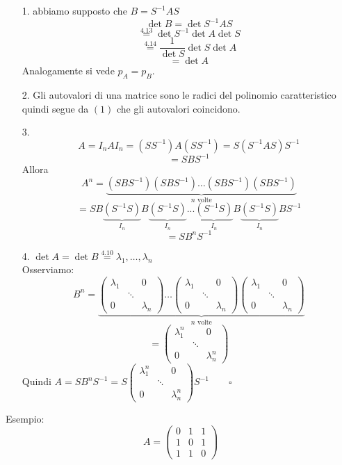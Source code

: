 \documentclass[12pt]{article}
\begin{document}
\begin{enumerate}
    \item[1.] abbiamo supposto che $B = S^{-1}AS$
    \[\det{B} = \det{S^{-1}AS}\]
    \[\stackrel{4.13}{=} \det{S^{-1}}\det{A}\det{S}\]
    \[\stackrel{4.14}{=} \frac{1}{\det{S}}\det{S}\det{A}\]
    \[= \det{A}\]
    Analogamente si vede $p_A = p_B$.
    \item[2.] Gli autovalori di una matrice sono le radici del polinomio caratteristico quindi segue da $(1)$ che gli autovalori coincidono.
    \item[3.] \[A = I_nAI_n = (SS^{-1})A(SS^{-1}) = S(S^{-1}AS)S^{-1}\]
    \[= SBS^{-1}\]
    Allora
    \[A^n = \underbrace{(SBS^{-1})(SBS^{-1})\dots(SBS^{-1})(SBS^{-1})}_{n \text{ volte}}\]
    \[= SB\underbrace{(S^{-1}S)}_{I_n}B\underbrace{(S^{-1}S)}_{I_n}...\underbrace{(S^{-1}S)}_{I_n}B\underbrace{(S^{-1}S)}_{I_n}BS^{-1}\]
    \[= SB^nS^{-1}\]
    \item[4.] $\det{A} = \det{B} \stackrel{4.10}{=} \lambda_1, \dots, \lambda_n$\\
    Osserviamo:
    \[B^{n} = \underbrace{\begin{pmatrix}
        \lambda_1 & & 0\\
         & \ddots &\\
         0 & & \lambda_n
    \end{pmatrix} \dots \begin{pmatrix}
        \lambda_1 & & 0\\
         & \ddots &\\
         0 & & \lambda_n
    \end{pmatrix} \begin{pmatrix}
        \lambda_1 & & 0\\
         & \ddots &\\
         0 & & \lambda_n
    \end{pmatrix}}_{n \text{ volte}}\]
    \[= \begin{pmatrix}
        \lambda_1^{n} & & 0\\
         & \ddots &\\
         0 & & \lambda_n^n
    \end{pmatrix}\]
    Quindi $A = SB^nS^{-1} = S\begin{pmatrix}
        \lambda_1^{n} & & 0\\
         & \ddots &\\
         0 & & \lambda_n^n
    \end{pmatrix}S^{-1} \quad \quad \square$
\end{enumerate}
Esempio:
\[A = \begin{pmatrix}
    0 & 1 & 1\\
    1 & 0 & 1\\
    1 & 1 & 0
\end{pmatrix}\]
\end{document}
